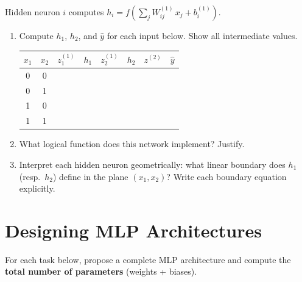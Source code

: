 \documentclass[11pt, a4paper]{article}
\begin{document}
Hidden neuron $i$ computes $h_i = f\!\left(\sum_j W^{(1)}_{ij}\, x_j + b^{(1)}_i\right)$.

\begin{enumerate}[label=\textbf{\arabic*.}, leftmargin=*, itemsep=0.9em]

  \item Compute $h_1$, $h_2$, and $\hat{y}$ for each input below. Show all intermediate values.

\vspace{0.5em}
\begin{center}
\renewcommand{\arraystretch}{2}
\begin{tabular}{cc|cc|cc|cc}
\toprule
$x_1$ & $x_2$ & $z_1^{(1)}$ & $h_1$ & $z_2^{(1)}$ & $h_2$ & $z^{(2)}$ & $\hat{y}$ \\
\midrule
0 & 0 & & & & & & \\
0 & 1 & & & & & & \\
1 & 0 & & & & & & \\
1 & 1 & & & & & & \\
\bottomrule
\end{tabular}
\end{center}

  \item What logical function does this network implement? Justify.

  \vspace{3em}

  \item Interpret each hidden neuron geometrically: what linear boundary does $h_1$ (resp.\ $h_2$) define in the plane $(x_1, x_2)$? Write each boundary equation explicitly.

  \vspace{3.5em}

\end{enumerate}

\section{Designing MLP Architectures}

For each task below, propose a complete MLP architecture and compute the \textbf{total number of parameters} (weights + biases).

\vspace{0.6em}
\end{document}

